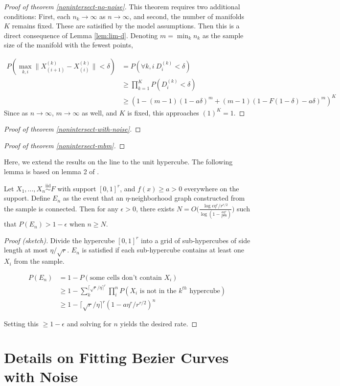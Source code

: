\documentclass[12pt]{article}
\begin{document}
\begin{proof}[Proof of theorem \ref{nonintersect-no-noise}]
This theorem requires two additional conditions: 
First, each $n_k \to \infty$ as $n \to \infty$, and second, the number of manifolds $K$ remains fixed. 
These are satisified by the model assumptions. 
Then this is a direct consequence of Lemma \ref{lem:lim-d}. 
Denoting $m = \min_k n_k$ as the sample size of the manifold with the fewest points, 

$$
\begin{aligned}
P(\max_{k,i} \|X_{(i+1)}^{(k)} - X_{(i)}^{(k)}\| < \delta) & = P(\forall k, i ~ D_i^{(k)} < \delta) \\
& \geq \prod_{k=1}^K P(D_i^{(k)} < \delta) \\
& \geq (1 - (m-1) (1 - a \delta)^{m} + (m-1) (1 - F(1-\delta) - a \delta)^{m})^K
\end{aligned}
$$
Since as $n \to \infty$, $m \to \infty$ as well, and $K$ is fixed, this approaches $(1)^K = 1$. 
\end{proof}

\begin{proof}[Proof of theorem \ref{nonintersect-with-noise}]
\end{proof}

\begin{proof}[Proof of theorem \ref{nonintersect-mbm}]
\end{proof}

Here, we extend the results on the line to the unit hypercube. The
following lemma is based on lemma 2 of
\citet{trosset2020rehabilitating}.

\begin{lemma}
\label{thm:multidim}
Let $X_1, ..., X_n \stackrel{\mathrm{iid}}{\sim}F$ with support $[0, 1]^r$, and $f(x) \geq a > 0$ everywhere on the support. 
Define $E_n$ as the event that an $\eta$-neighborhood graph constructed from the sample is connected. 
Then for any $\epsilon > 0$, there exists $N = O \bigg( \frac{\log \epsilon \eta^r / r^{r/2}}{\log (1 - \frac{a \eta^r}{r^{r / 2}})} \bigg)$ such that $P(E_n) > 1 - \epsilon$ when $n \geq N$.
\end{lemma}

\begin{proof}[Proof (sketch)]
Divide the hypercube $[0, 1]^r$ into a grid of sub-hypercubes of side length at most $\eta / \sqrt{r}$. 
$E_n$ is satisfied if each sub-hypercube contains at least one $X_i$ from the sample. 

$$
\begin{aligned}
P(E_n) & = 1 - P(\text{some cells don't contain } X_i) \\
& \geq 1 - \sum_k^{\lceil \sqrt{r} / \eta \rceil^r} \prod_i^n P(X_i \text{ is not in the } k^{th} \text{ hypercube}) \\
& \geq 1 - \lceil \sqrt{r} / \eta \rceil^r (1 - a \eta^r / r^{r/2})^n
\end{aligned}
$$

Setting this $\geq 1 - \epsilon$ and solving for $n$ yields the desired rate. 
\end{proof}

\section{Details on Fitting Bezier Curves with Noise}



\end{document}
